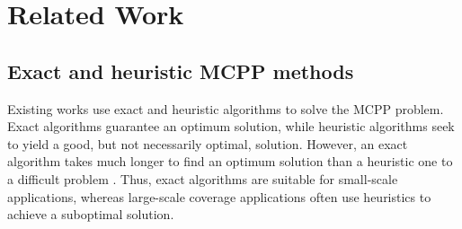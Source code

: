 \documentclass[journal,article,submit,pdftex,moreauthors]{Definitions/mdpi}
\begin{document}
\section{Related Work}
\label{Sec_Related_Work}

\subsection{Exact and heuristic MCPP methods}

Existing works use exact and heuristic algorithms to solve the MCPP problem. Exact algorithms guarantee an optimum solution, while heuristic algorithms seek to yield a good, but not necessarily optimal, solution. However, an exact algorithm takes much longer to find an optimum solution than a heuristic one to a difficult problem \cite{Rafael2022Exact}. Thus, exact algorithms are suitable for small-scale applications, whereas large-scale coverage applications often use heuristics to achieve a suboptimal solution.
\end{document}
